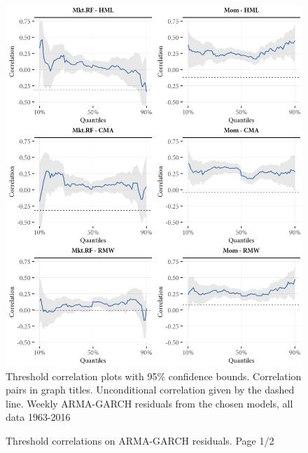 \begin{figure}[htbp]
  \caption{Threshold correlations on ARMA-GARCH residuals. Page 1/2}
  \label{fig:threshold1}
  \centering
  \begin{minipage}{\textwidth}
  \includegraphics[scale=1]{graphics/threshold1.png}  
  \vspace{3mm}
  \footnotesize
  Threshold correlation plots with 95\% confidence bounds. Correlation pairs in graph titles. Unconditional correlation given by the dashed line. Weekly ARMA-GARCH residuals from the chosen models, all data 1963-2016
  \end{minipage}
\end{figure}
